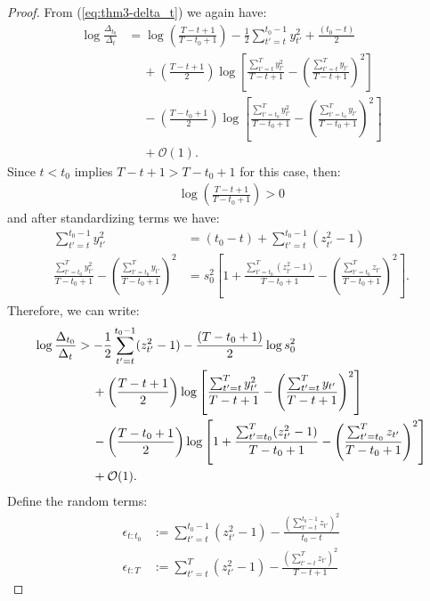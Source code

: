 \begin{proof}
From (\ref{eq:thm3-delta_t}) we again have:
\begin{align*}
    \log \frac{\Delta_{t_0}}{\Delta_t} &= \log \left(\frac{T - t + 1}{T - t_0 +1} \right) - \frac{1}{2} \sum_{t' = t}^{t_0 - 1} y_{t'}^2 + \frac{(t_0-t)}{2} \\
    &\quad\: + \left(\frac{T - t +1}{2}\right)\log\left[\frac{\sum_{t'=t}^T y_{t'}^2}{T-t+1} - \left(\frac{\sum_{t'=t}^T y_{t'}}{T-t+1}\right)^2 \right] \\
    &\quad\: -\left(\frac{T - t_0 +1}{2}\right)\log\left[\frac{\sum_{t'=t_0}^T y_{t'}^2}{T-t_0+1} - \left(\frac{\sum_{t'=t_0}^T y_{t'}}{T-t_0+1}\right)^2 \right] \\
    &\quad\: + \mathcal{O}(1).
\end{align*}
Since $t < t_0$ implies $T-t + 1> T-t_0 +1$ for this case, then:
\begin{align*}
    \log\left(\frac{T-t+1}{T-t_0+1}\right) > 0
\end{align*}
and after standardizing terms we have:
\small
\begin{align*}
    \sum_{t' = t}^{t_0 - 1} y_{t'}^2 &= (t_0-t) + \sum_{t' = t}^{t_0 - 1} (z_{t'}^2-1) \\
    \frac{\sum_{t'=t_0}^T y_{t'}^2}{T-t_0+1} - \left(\frac{\sum_{t'=t_0}^T y_{t'}}{T-t_0+1}\right)^2
    &= s_0^2 \left[1 + \frac{\sum_{t'=t_0}^T (z_{t'}^2-1)}{T-t_0+1} - \left(\frac{\sum_{t'=t_0}^T z_{t'}}{T-t_0+1}\right)^2\right]. 
\end{align*}
\normalsize
Therefore, we can write:
\small
\begin{align*}
    \log \frac{\Delta_{t_0}}{\Delta_t} &> - \frac{1}{2} \sum_{t' = t}^{t_0 - 1} (z_{t'}^2-1) - \frac{(T-t_0+1)}{2}\log s_0^2 \notag \\
    &\quad\: + \left(\frac{T - t +1}{2}\right)\log\left[\frac{\sum_{t'=t}^T y_{t'}^2}{T-t+1} - \left(\frac{\sum_{t'=t}^T y_{t'}}{T-t+1}\right)^2 \right] \notag \\
    &\quad\: -\left(\frac{T - t_0 +1}{2}\right)\log \left[1 + \frac{\sum_{t'=t_0}^T (z_{t'}^2-1)}{T-t_0+1} - \left(\frac{\sum_{t'=t_0}^T z_{t'}}{T-t_0+1}\right)^2\right] \notag \\
    &\quad\: + \mathcal{O}(1). 
\end{align*}
\normalsize
Define the random terms:
\begin{align}
    \epsilon_{t:t_0} &:=  \sum_{t'=t}^{t_0-1 } (z^2_{t'}-1) - \frac{\left(\sum_{t'=t}^{t_0-1 } z_{t'}\right)^2}{t_0-t} \label{eq:thm-3-error-t:t0} \\ 
    \epsilon_{t:T} &:= \sum_{t'=t}^{T} (z^2_{t'}-1)  - \frac{\left(\sum_{t'=t}^{T} z_{t'} \right)^2}{T-t+1} \label{eq:thm-3-error-t:T}

\end{align}
\end{proof}
